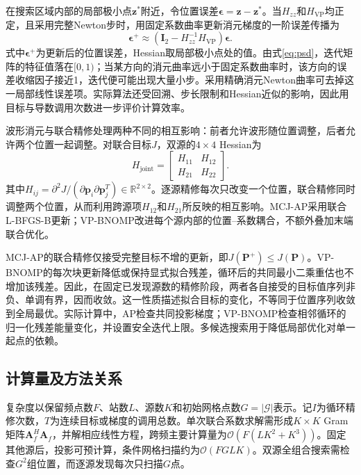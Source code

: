 \documentclass[a4paper,fleqn]{cas-sc}
\numberwithin{equation}{section}
\numberwithin{figure}{section}
\numberwithin{table}{section}
\newcommand{\R}{\mathbb R}
\begin{document}
在搜索区域内部的局部极小点$\bm z^*$附近，令位置误差$\bm\epsilon=\bm z-\bm z^*$。当$H_{zz}$和$H_{\mathrm{VP}}$均正定，且采用完整Newton步时，用固定系数曲率更新消元梯度的一阶误差传播为
\begin{equation}
 \bm\epsilon^{+}\approx
 \left(\bm I_2-H_{zz}^{-1}H_{\mathrm{VP}}\right)\bm\epsilon .\label{eq:localrate}
\end{equation}
式中$\bm\epsilon^+$为更新后的位置误差，Hessian取局部极小点处的值。由式\eqref{eq:psd}，迭代矩阵的特征值落在$[0,1)$；当某方向的消元曲率远小于固定系数曲率时，该方向的误差收缩因子接近1，迭代便可能出现大量小步。采用精确消元Newton曲率可去掉这一局部线性误差项。实际算法还受回溯、步长限制和Hessian近似的影响，因此用目标与导数调用次数进一步评价计算效率。

波形消元与联合精修处理两种不同的相互影响：前者允许波形随位置调整，后者允许两个位置一起调整。对联合目标$J$，双源的$4\times4$ Hessian为
\begin{equation}
 H_{\mathrm{joint}}=
 \begin{bmatrix}H_{11}&H_{12}\\H_{21}&H_{22}\end{bmatrix} .
\end{equation}
其中$H_{ij}=\partial^2J/(\partial\bm p_i\partial\bm p_j^T)\in\R^{2\times2}$。逐源精修每次只改变一个位置，联合精修同时调整两个位置，从而利用跨源项$H_{12}$和$H_{21}$所反映的相互影响。MCJ-AP采用联合L-BFGS-B更新；VP-BNOMP改进每个源内部的位置--系数耦合，不额外叠加末端联合优化。

MCJ-AP的联合精修仅接受完整目标不增的更新，即$J(\bm P^+)\le J(\bm P)$。VP-BNOMP的每次块更新降低或保持显式拟合残差，循环后的共同最小二乘重估也不增加该残差。因此，在固定已发现源数的精修阶段，两者各自接受的目标值序列非负、单调有界，因而收敛。这一性质描述拟合目标的变化，不等同于位置序列收敛到全局最优。实际计算中，AP检查共同投影梯度；VP-BNOMP检查相邻循环的归一化残差能量变化，并设置安全迭代上限。多候选搜索用于降低局部优化对单一起点的依赖。

\subsection{计算量及方法关系}\label{sec:complexity}
复杂度以保留频点数$F$、站数$L$、源数$K$和初始网格点数$G=|\mathcal G|$表示。记$I$为循环精修次数，$T$为连续目标或梯度的调用总数。单次联合系数求解需形成$K\times K$ Gram矩阵$\bm A_f^H\bm A_f$，并解相应线性方程，跨频主要计算量为$\mathcal O(F(LK^2+K^3))$。固定其他源后，投影可预计算，条件网格扫描约为$\mathcal O(FGLK)$。双源全组合搜索需检查$G^2$组位置，而逐源发现每次只扫描$G$点。
\end{document}
